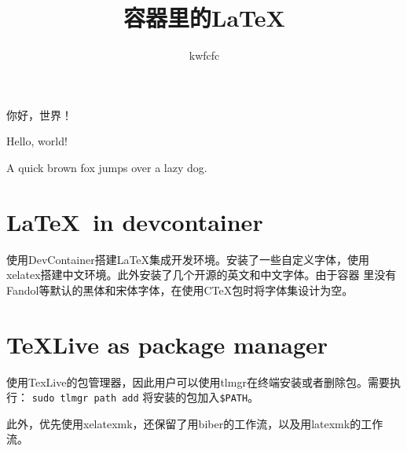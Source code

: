 \documentclass[UTF8]{article}
\author{kwfcfc}
\date{}
\title{容器里的\LaTeX }
\begin{document}
\maketitle

你好，世界！

Hello, world!

A quick brown fox jumps over a lazy dog.

\section{\LaTeX~in devcontainer}

使用DevContainer搭建\LaTeX 集成开发环境。安装了一些自定义字体，使用xelatex搭建中文环境。此外安装了几个开源的英文和中文字体。由于容器
里没有Fandol等默认的黑体和宋体字体，在使用CTeX包时将字体集设计为空。

\section{TeXLive as package manager}

使用TexLive的包管理器，因此用户可以使用tlmgr在终端安装或者删除包。需要执行：
\texttt{sudo tlmgr path add}
将安装的包加入\texttt{\$PATH}。

此外，优先使用xelatexmk，还保留了用biber的工作流，以及用latexmk的工作流。
\end{document}
